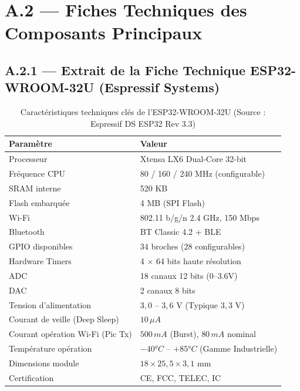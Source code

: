 \section{A.2 — Fiches Techniques des Composants Principaux}

\subsection{A.2.1 — Extrait de la Fiche Technique ESP32-WROOM-32U (Espressif Systems)}

\begin{table}[htbp]
\centering
\renewcommand{\arraystretch}{1.3}
\begin{tabular}{|l|l|}
\hline
\rowcolor{macouleur!20}
\textbf{Paramètre} & \textbf{Valeur} \\
\hline
Processeur & Xtensa LX6 Dual-Core 32-bit \\
\hline
Fréquence CPU & 80 / 160 / 240 MHz (configurable) \\
\hline
SRAM interne & 520 KB \\
\hline
Flash embarquée & 4 MB (SPI Flash) \\
\hline
Wi-Fi & 802.11 b/g/n 2.4 GHz, 150 Mbps \\
\hline
Bluetooth & BT Classic 4.2 + BLE \\
\hline
GPIO disponibles & 34 broches (28 configurables) \\
\hline
Hardware Timers & 4 × 64 bits haute résolution \\
\hline
ADC & 18 canaux 12 bits (0--3.6V) \\
\hline
DAC & 2 canaux 8 bits \\
\hline
Tension d'alimentation & $3{,}0$ -- $3{,}6$ V (Typique $3{,}3$ V) \\
\hline
Courant de veille (Deep Sleep) & $10\,\mu A$ \\
\hline
Courant opération Wi-Fi (Pic Tx) & $500\,mA$ (Burst), $80\,mA$ nominal \\
\hline
Température opération & $-40°C$ -- $+85°C$ (Gamme Industrielle) \\
\hline
Dimensions module & $18 \times 25{,}5 \times 3{,}1$ mm \\
\hline
Certification & CE, FCC, TELEC, IC \\
\hline
\end{tabular}
\caption{Caractéristiques techniques clés de l'ESP32-WROOM-32U (Source : Espressif DS ESP32 Rev 3.3)}
\label{tab:esp32_specs}
\end{table}

